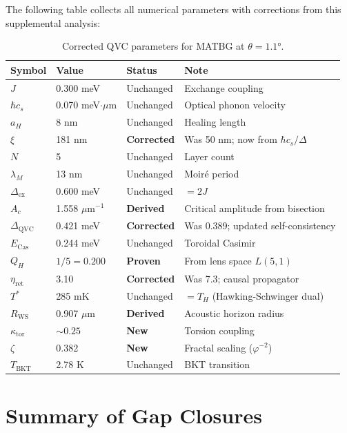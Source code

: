 \documentclass[11pt,letterpaper]{article}
\begin{document}
The following table collects all numerical parameters with corrections from this supplemental analysis:

\begin{table}[H]
\centering
\caption{Corrected QVC parameters for MATBG at $\theta = 1.1°$.}
\begin{tabular}{llll}
\toprule
\textbf{Symbol} & \textbf{Value} & \textbf{Status} & \textbf{Note} \\
\midrule
$J$ & 0.300 meV & Unchanged & Exchange coupling \\
$\hbar c_s$ & 0.070 meV$\cdot\mu$m & Unchanged & Optical phonon velocity \\
$a_H$ & 8 nm & Unchanged & Healing length \\
$\xi$ & 181 nm & \textbf{Corrected} & Was 50 nm; now from $\hbar c_s / \Delta$ \\
$N$ & 5 & Unchanged & Layer count \\
$\lambda_M$ & 13 nm & Unchanged & Moiré period \\
$\Delta_{\text{ex}}$ & 0.600 meV & Unchanged & $= 2J$ \\
$A_c$ & 1.558 $\mu$m$^{-1}$ & \textbf{Derived} & Critical amplitude from bisection \\
$\Delta_{\text{QVC}}$ & 0.421 meV & \textbf{Corrected} & Was 0.389; updated self-consistency \\
$E_{\text{Cas}}$ & 0.244 meV & Unchanged & Toroidal Casimir \\
$Q_H$ & $1/5 = 0.200$ & \textbf{Proven} & From lens space $L(5,1)$ \\
$\eta_{\text{ret}}$ & 3.10 & \textbf{Corrected} & Was 7.3; causal propagator \\
$T^*$ & 285 mK & Unchanged & $= T_H$ (Hawking-Schwinger dual) \\
$R_{\text{WS}}$ & 0.907 $\mu$m & \textbf{Derived} & Acoustic horizon radius \\
$\kappa_{\text{tor}}$ & $\sim 0.25$ & \textbf{New} & Torsion coupling \\
$\zeta$ & 0.382 & \textbf{New} & Fractal scaling ($\varphi^{-2}$) \\
$T_{\text{BKT}}$ & 2.78 K & Unchanged & BKT transition \\
\bottomrule
\end{tabular}
\label{tab:corrected_params}
\end{table}

\section{Summary of Gap Closures}
\label{sec:gaps}
\end{document}
